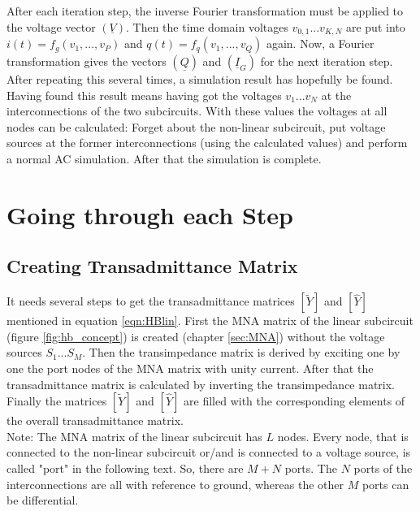 \addvspace{12pt}

After each iteration step, the inverse Fourier transformation must
be applied to the voltage vector $(\underline{V})$. Then the time domain
voltages $v_{0,1}...v_{K,N}$ are put into $i(t) = f_g(v_1, ..., v_P)$
and $q(t) = f_q(v_1, ..., v_Q)$ again. Now, a Fourier transformation
gives the vectors $(\underline{Q})$ and $(\underline{I}_G)$ for the
next iteration step. After repeating this several times, a simulation
result has hopefully be found.\\
Having found this result means having got the voltages $v_1...v_N$ at
the interconnections of the two subcircuits. With these values the
voltages at all nodes can be calculated: Forget about the non-linear
subcircuit, put voltage sources at the former interconnections (using
the calculated values) and perform a normal AC simulation. After that
the simulation is complete.


\section{Going through each Step}

\subsection{Creating Transadmittance Matrix}

It needs several steps to get the transadmittance matrices $[\tilde{Y}]$
and $[\hat{Y}]$ mentioned in equation \eqref{eqn:HBlin}. First the MNA
matrix of the linear subcircuit (figure \ref{fig:hb_concept}) is created
(chapter \ref{sec:MNA}) without the voltage sources $S_1$...$S_M$. Then
the transimpedance matrix is derived by
exciting one by one the port nodes of the MNA matrix with unity current.
After that the transadmittance matrix is calculated by inverting the
transimpedance matrix. Finally the matrices $[\tilde{Y}]$ and $[\hat{Y}]$
are filled with the corresponding elements of the overall transadmittance
matrix.\\
Note: The MNA matrix of the linear subcircuit has $L$ nodes.
Every node, that is connected to the non-linear subcircuit or/and is
connected to a voltage source, is called "port" in the following text.
So, there are $M+N$ ports. The $N$ ports of the interconnections are
all with reference to ground, whereas the other $M$ ports can be
differential.

\addvspace{12pt}

